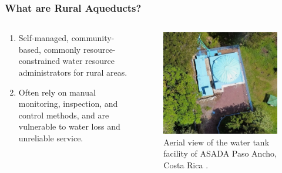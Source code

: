\documentclass[aspectratio=169]{beamer}
\begin{document}
\begin{frame}
    \frametitle{What are Rural Aqueducts?}

    \begin{columns}[T] %
        \begin{column}{0.5\textwidth}
            \begin{enumerate}
                \item Self-managed, community-based, commonly resource-constrained water resource administrators for rural areas.
                \item Often rely on manual monitoring, inspection, and control methods, and are vulnerable to water loss and unreliable service.
            \end{enumerate}
        \end{column}
        \begin{column}{0.5\textwidth}
            \begin{figure}
                \includegraphics[width=0.8\columnwidth]{images/asada.png}
                \caption{Aerial view of the water tank facility of ASADA Paso Ancho, Costa Rica \cite{rioceleste}.}
            \end{figure}
        \end{column}
    \end{columns}
\end{frame}
\end{document}
